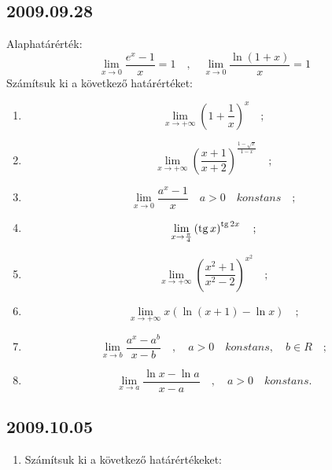 \subsection*{2009.09.28}
Alaphatárérték:
$$\lim_{x\to 0}\frac{e^x-1}{x}=1\quad,\quad\lim_{x\to 0}\frac{\ln(1+x)}{x}=1$$
Számítsuk ki a következő határértéket:
\begin{enumerate}
\item $$\lim_{x\to +\infty}\left(1+\frac{1}{x}\right)^x\quad;$$
\item $$\lim_{x\to +\infty}\left(\frac{x+1}{x+2}\right)^{\frac{1-\sqrt{x}}{1-x}}\quad;$$
\item $$\lim_{x\to 0}\frac{a^x-1}{x}\quad a>0\quad konstans\quad;$$
\item $$\lim_{x\to\frac{\pi}{4}}\left(\mathop{\mathrm{tg}}\nolimits x\right)^{\mathop{\mathrm{tg}}\nolimits 2x}\quad;$$
\item $$\lim_{x\to +\infty}\left(\frac{x^2+1}{x^2-2}\right)^{x^2}\quad;$$
\item $$\lim_{x\to +\infty}x\left(\ln(x+1)-\ln x\right)\quad;$$
\item $$\lim_{x\to b}{\frac{a^x-a^b}{x-b}}\quad,\quad a>0\quad konstans,\quad b\in{R}\quad;$$
\item $$\lim_{x\to a}{\frac{\ln x-\ln a}{x-a}}\quad,\quad a>0\quad konstans.$$
\end{enumerate}
\subsection*{2009.10.05}
\begin{enumerate}
\item Számítsuk ki a következő határértékeket:
\end{enumerate}
